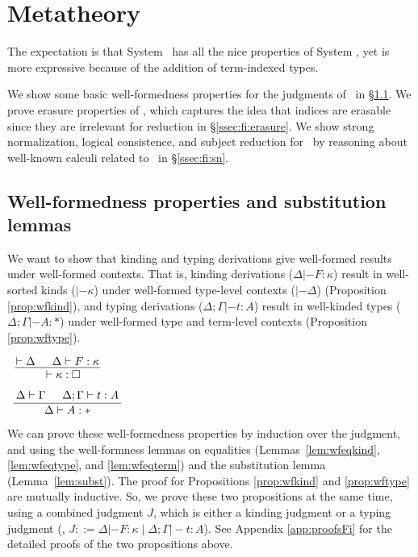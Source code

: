 \section{Metatheory}\label{sec:fi:theory}
The expectation is that System \Fi\ has all the nice properties of System \Fw,
yet is more expressive because of the addition of term-indexed types.

We show some basic well-formedness properties for
the judgments of \Fi\ in \S\ref{ssec:fi:wf}.
We prove erasure properties of \Fi, which captures the idea that indices are
erasable since they are irrelevant for reduction in \S\ref{ssec:fi:erasure}.
We show strong normalization, logical consistence, and subject reduction for
\Fi\ by reasoning about well-known calculi related to \Fi\ in \S\ref{ssec:fi:sn}.

\subsection{Well-formedness properties and substitution lemmas}
\label{ssec:fi:wf}
We want to show that kinding and typing derivations give
well-formed results under well-formed contexts. That is,
kinding derivations ($\Delta |- F : \kappa$) result in well-sorted kinds
($|- \kappa$) under well-formed type-level contexts ($|- \Delta$)
(Proposition \ref{prop:wfkind}), and
typing derivations ($\Delta;\Gamma |- t : A$) result in well-kinded types
($\Delta;\Gamma |- A:*$) under well-formed type and term-level contexts
(Proposition \ref{prop:wftype}).

\begin{proposition}
\label{prop:wfkind}
$ \inference*{ |- \Delta & \Delta |- F : \kappa}{
	\qquad |- \kappa:\square \quad} $
\end{proposition}

\begin{proposition}
\label{prop:wftype}
$ \inference*{ \Delta |- \Gamma & \Delta;\Gamma |- t : A}{
	\qquad \Delta |- A : * \qquad} $
\end{proposition}

We can prove these well-formedness properties
by induction over the judgment, and using 
the well-formness lemmas on equalities
(Lemmas~\ref{lem:wfeqkind}, \ref{lem:wfeqtype}, and \ref{lem:wfeqterm})
and the substitution lemma (Lemma~\ref{lem:subst}).
The proof for Propositions \ref{prop:wfkind} and \ref{prop:wftype}
are mutually inductive.  So, we prove these two propositions
at the same time, using a combined judgment $J$,
which is either a kinding judgment or a typing judgment
(\ie, $J ::= \Delta |- F : \kappa \mid \Delta;\Gamma |- t : A$).
See Appendix \ref{app:proofsFi} for the detailed proofs of the
two propositions above.

